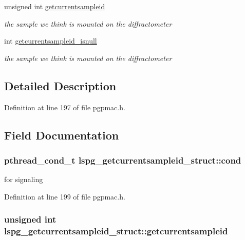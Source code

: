 \begin{DoxyCompactItemize}
unsigned int \hyperlink{structlspg__getcurrentsampleid__struct_af629de1e076fd6763bccea3547ef24e7}{getcurrentsampleid}
\begin{DoxyCompactList}\small\item\em the sample we think is mounted on the diffractometer \end{DoxyCompactList}\item 
int \hyperlink{structlspg__getcurrentsampleid__struct_af370f8d1aaec7dd15121dc65d2a6cfc1}{getcurrentsampleid\-\_\-isnull}
\begin{DoxyCompactList}\small\item\em the sample we think is mounted on the diffractometer \end{DoxyCompactList}\end{DoxyCompactItemize}


\subsection{Detailed Description}


Definition at line 197 of file pgpmac.\-h.



\subsection{Field Documentation}
\hypertarget{structlspg__getcurrentsampleid__struct_a289960e45fdc9339a05dc8607f1b7563}{
\subsubsection[{cond}]{\setlength{\rightskip}{0pt plus 5cm}pthread\-\_\-cond\-\_\-t lspg\-\_\-getcurrentsampleid\-\_\-struct\-::cond}}\label{structlspg__getcurrentsampleid__struct_a289960e45fdc9339a05dc8607f1b7563}


for signaling 



Definition at line 199 of file pgpmac.\-h.

\hypertarget{structlspg__getcurrentsampleid__struct_af629de1e076fd6763bccea3547ef24e7}{
\subsubsection[{getcurrentsampleid}]{\setlength{\rightskip}{0pt plus 5cm}unsigned int lspg\-\_\-getcurrentsampleid\-\_\-struct\-::getcurrentsampleid}}\label{structlspg__getcurrentsampleid__struct_af629de1e076fd6763bccea3547ef24e7}


